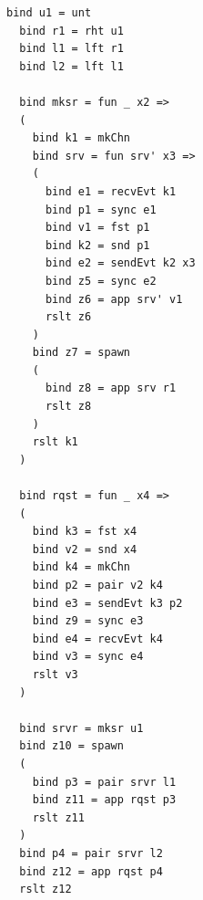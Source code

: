 \documentclass[letterpaper, 11pt]{report}
\begin{document}
\begin{lstlisting}[language=normal_lang, mathescape]
  bind u1 = unt
  bind r1 = rht u1
  bind l1 = lft r1
  bind l2 = lft l1

  bind mksr = fun _ x2 => 
  (
    bind k1 = mkChn
    bind srv = fun srv' x3 =>
    (
      bind e1 = recvEvt k1
      bind p1 = sync e1
      bind v1 = fst p1
      bind k2 = snd p1 
      bind e2 = sendEvt k2 x3
      bind z5 = sync e2
      bind z6 = app srv' v1
      rslt z6 
    )
    bind z7 = spawn
    (
      bind z8 = app srv r1
      rslt z8 
    )
    rslt k1
  )

  bind rqst = fun _ x4 =>
  (
    bind k3 = fst x4
    bind v2 = snd x4
    bind k4 = mkChn
    bind p2 = pair v2 k4
    bind e3 = sendEvt k3 p2
    bind z9 = sync e3
    bind e4 = recvEvt k4
    bind v3 = sync e4
    rslt v3
  )

  bind srvr = mksr u1
  bind z10 = spawn
  ( 
    bind p3 = pair srvr l1
    bind z11 = app rqst p3
    rslt z11
  )
  bind p4 = pair srvr l2
  bind z12 = app rqst p4
  rslt z12
\end{lstlisting}
\end{document}
